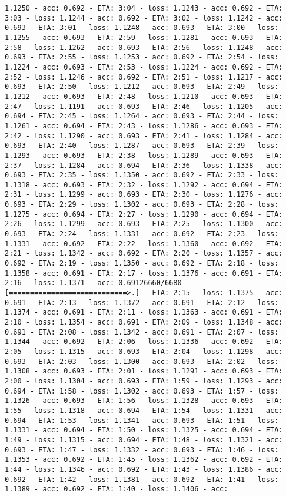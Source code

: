 \documentclass[11pt]{article}
\begin{document}
\begin{Verbatim}[commandchars=\\\{\}]
1.1250 - acc: 0.692 - ETA: 3:04 - loss: 1.1243 - acc: 0.692 - ETA: 3:03 - loss: 1.1244 - acc: 0.692 - ETA: 3:02 - loss: 1.1242 - acc: 0.693 - ETA: 3:01 - loss: 1.1248 - acc: 0.693 - ETA: 3:00 - loss: 1.1255 - acc: 0.693 - ETA: 2:59 - loss: 1.1281 - acc: 0.693 - ETA: 2:58 - loss: 1.1262 - acc: 0.693 - ETA: 2:56 - loss: 1.1248 - acc: 0.693 - ETA: 2:55 - loss: 1.1253 - acc: 0.692 - ETA: 2:54 - loss: 1.1224 - acc: 0.693 - ETA: 2:53 - loss: 1.1224 - acc: 0.692 - ETA: 2:52 - loss: 1.1246 - acc: 0.692 - ETA: 2:51 - loss: 1.1217 - acc: 0.693 - ETA: 2:50 - loss: 1.1212 - acc: 0.693 - ETA: 2:49 - loss: 1.1212 - acc: 0.693 - ETA: 2:48 - loss: 1.1210 - acc: 0.693 - ETA: 2:47 - loss: 1.1191 - acc: 0.693 - ETA: 2:46 - loss: 1.1205 - acc: 0.694 - ETA: 2:45 - loss: 1.1264 - acc: 0.693 - ETA: 2:44 - loss: 1.1261 - acc: 0.694 - ETA: 2:43 - loss: 1.1286 - acc: 0.693 - ETA: 2:42 - loss: 1.1290 - acc: 0.693 - ETA: 2:41 - loss: 1.1284 - acc: 0.693 - ETA: 2:40 - loss: 1.1287 - acc: 0.693 - ETA: 2:39 - loss: 1.1293 - acc: 0.693 - ETA: 2:38 - loss: 1.1289 - acc: 0.693 - ETA: 2:37 - loss: 1.1284 - acc: 0.694 - ETA: 2:36 - loss: 1.1338 - acc: 0.693 - ETA: 2:35 - loss: 1.1350 - acc: 0.692 - ETA: 2:33 - loss: 1.1318 - acc: 0.693 - ETA: 2:32 - loss: 1.1292 - acc: 0.694 - ETA: 2:31 - loss: 1.1299 - acc: 0.693 - ETA: 2:30 - loss: 1.1276 - acc: 0.693 - ETA: 2:29 - loss: 1.1302 - acc: 0.693 - ETA: 2:28 - loss: 1.1275 - acc: 0.694 - ETA: 2:27 - loss: 1.1290 - acc: 0.694 - ETA: 2:26 - loss: 1.1299 - acc: 0.693 - ETA: 2:25 - loss: 1.1300 - acc: 0.693 - ETA: 2:24 - loss: 1.1331 - acc: 0.692 - ETA: 2:23 - loss: 1.1331 - acc: 0.692 - ETA: 2:22 - loss: 1.1360 - acc: 0.692 - ETA: 2:21 - loss: 1.1342 - acc: 0.692 - ETA: 2:20 - loss: 1.1357 - acc: 0.692 - ETA: 2:19 - loss: 1.1350 - acc: 0.692 - ETA: 2:18 - loss: 1.1358 - acc: 0.691 - ETA: 2:17 - loss: 1.1376 - acc: 0.691 - ETA: 2:16 - loss: 1.1371 - acc: 0.69126660/6680 [============================>.] - ETA: 2:15 - loss: 1.1375 - acc: 0.691 - ETA: 2:13 - loss: 1.1372 - acc: 0.691 - ETA: 2:12 - loss: 1.1374 - acc: 0.691 - ETA: 2:11 - loss: 1.1363 - acc: 0.691 - ETA: 2:10 - loss: 1.1354 - acc: 0.691 - ETA: 2:09 - loss: 1.1348 - acc: 0.691 - ETA: 2:08 - loss: 1.1342 - acc: 0.691 - ETA: 2:07 - loss: 1.1344 - acc: 0.692 - ETA: 2:06 - loss: 1.1336 - acc: 0.692 - ETA: 2:05 - loss: 1.1315 - acc: 0.693 - ETA: 2:04 - loss: 1.1298 - acc: 0.693 - ETA: 2:03 - loss: 1.1300 - acc: 0.693 - ETA: 2:02 - loss: 1.1308 - acc: 0.693 - ETA: 2:01 - loss: 1.1291 - acc: 0.693 - ETA: 2:00 - loss: 1.1304 - acc: 0.693 - ETA: 1:59 - loss: 1.1293 - acc: 0.694 - ETA: 1:58 - loss: 1.1302 - acc: 0.693 - ETA: 1:57 - loss: 1.1326 - acc: 0.693 - ETA: 1:56 - loss: 1.1328 - acc: 0.693 - ETA: 1:55 - loss: 1.1318 - acc: 0.694 - ETA: 1:54 - loss: 1.1331 - acc: 0.694 - ETA: 1:53 - loss: 1.1341 - acc: 0.693 - ETA: 1:51 - loss: 1.1331 - acc: 0.694 - ETA: 1:50 - loss: 1.1325 - acc: 0.694 - ETA: 1:49 - loss: 1.1315 - acc: 0.694 - ETA: 1:48 - loss: 1.1321 - acc: 0.693 - ETA: 1:47 - loss: 1.1332 - acc: 0.693 - ETA: 1:46 - loss: 1.1353 - acc: 0.692 - ETA: 1:45 - loss: 1.1362 - acc: 0.692 - ETA: 1:44 - loss: 1.1346 - acc: 0.692 - ETA: 1:43 - loss: 1.1386 - acc: 0.692 - ETA: 1:42 - loss: 1.1381 - acc: 0.692 - ETA: 1:41 - loss: 1.1389 - acc: 0.692 - ETA: 1:40 - loss: 1.1406 - acc: 
\end{Verbatim}
\end{document}

